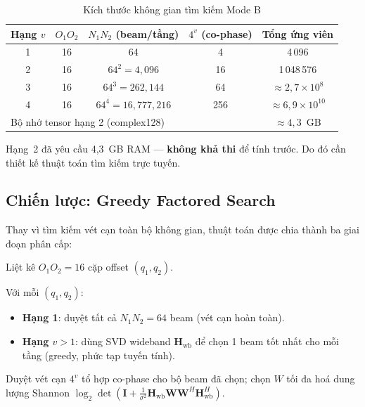 \documentclass[11pt,a4paper]{article}
\begin{document}
\begin{table}[H]
\centering
\caption{Kích thước không gian tìm kiếm Mode B}
\begin{tabular}{ccccc}
\toprule
Hạng $v$ & $O_1 O_2$ & $N_1 N_2$ (beam/tầng) & $4^v$ (co-phase) & Tổng ứng viên \\
\midrule
1 & 16 & 64 & 4 & 4\,096 \\
2 & 16 & $64^2 = 4{,}096$ & 16 & 1\,048\,576 \\
3 & 16 & $64^3 = 262{,}144$ & 64 & $\approx 2{,}7 \times 10^8$ \\
4 & 16 & $64^4 = 16{,}777{,}216$ & 256 & $\approx 6{,}9 \times 10^{10}$ \\
\midrule
\multicolumn{4}{l}{Bộ nhớ tensor hạng 2 (complex128)} & $\approx 4{,}3$~GB \\
\bottomrule
\end{tabular}
\end{table}

\noindent Hạng~2 đã yêu cầu 4,3~GB RAM --- \textbf{không khả thi} để tính trước.
Do đó cần thiết kế thuật toán tìm kiếm trực tuyến.

\subsection{Chiến lược: Greedy Factored Search}

Thay vì tìm kiếm vét cạn toàn bộ không gian, thuật toán được chia thành
ba giai đoạn phân cấp:

\begin{tcolorbox}[colback=blue!5,colframe=blue!50,title=Greedy Factored Search --- Ba giai đoạn]
\begin{description}[leftmargin=2em]
  \item[Giai đoạn 1:] Liệt kê $O_1 O_2 = 16$ cặp offset $(q_1, q_2)$.
  \item[Giai đoạn 2:] Với mỗi $(q_1, q_2)$:
    \begin{itemize}
      \item \textbf{Hạng 1}: duyệt tất cả $N_1 N_2 = 64$ beam (vét cạn hoàn toàn).
      \item \textbf{Hạng $v > 1$}: dùng SVD wideband $\mathbf{H}_\text{wb}$ để chọn 1 beam tốt nhất
            cho mỗi tầng (greedy, phức tạp tuyến tính).
    \end{itemize}
  \item[Giai đoạn 3:] Duyệt vét cạn $4^v$ tổ hợp co-phase cho bộ beam đã chọn;
        chọn $W$ tối đa hoá dung lượng Shannon $\log_2\det(\mathbf{I} + \frac{1}{\sigma^2}\mathbf{H}_\text{wb}\mathbf{W}\mathbf{W}^H\mathbf{H}_\text{wb}^H)$.
\end{description}
\end{tcolorbox}
\end{document}
